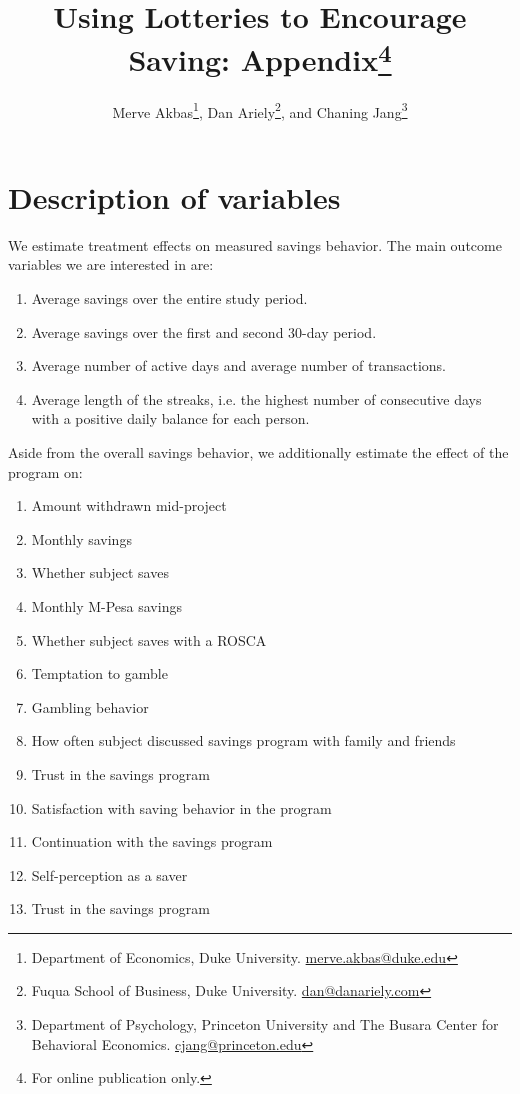 \documentclass[10pt]{article}
\begin{document}
\title{Using Lotteries to Encourage Saving: Appendix\thanks{For online publication only.}}

\author{Merve Akbas\thanks{Department of Economics, Duke University. \protect\href{mailto:merve.akbas@duke.edu}{merve.akbas@duke.edu}}, Dan Ariely\thanks{Fuqua School of Business, Duke University. \protect\href{mailto:dan@danariely.com}{dan@danariely.com}}, and Chaning Jang\thanks{Department of Psychology, Princeton University and The Busara Center for Behavioral Economics. \protect\href{mailto:cjang@princeton.edu}{cjang@princeton.edu}}}

\maketitle

\newpage

\tableofcontents

\newpage

\appendix

\section{Description of variables}

	We estimate treatment effects on measured savings behavior. The main outcome variables we are interested in are:

		\begin{enumerate}
		\item Average savings over the entire study period.
		\item Average savings over the first and second 30-day period.
		\item Average number of active days and average number of transactions.
		\item Average length of the streaks, i.e. the highest number of consecutive days with a positive daily balance for each person.
		\end{enumerate}

	Aside from the overall savings behavior, we additionally estimate the effect of the program on:

		\begin{enumerate}
		\item Amount withdrawn mid-project
		\item Monthly savings
		\item Whether subject saves
		\item Monthly M-Pesa savings
		\item Whether subject saves with a ROSCA
		\item Temptation to gamble
		\item Gambling behavior
		\item How often subject discussed savings program with family and friends
		\item Trust in the savings program
		\item Satisfaction with saving behavior in the program
		\item Continuation with the savings program
		\item Self-perception as a saver
		\item Trust in the savings program
		\end{enumerate}
\end{document}
